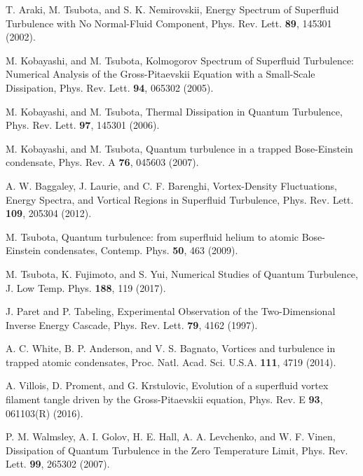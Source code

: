 \documentclass[aps,onecolumn,pra,longbibliography]{revtex4}
\begin{document}
\begin{thebibliography}{99}
		T. Araki, M. Tsubota, and S. K. Nemirovskii,
		Energy Spectrum of Superfluid Turbulence with No Normal-Fluid Component,
		Phys. Rev. Lett. \textbf{89}, 145301 (2002).

		M. Kobayashi, and M. Tsubota,
		Kolmogorov Spectrum of Superfluid Turbulence:
		Numerical Analysis of the Gross-Pitaevskii Equation
		with a Small-Scale Dissipation,
		Phys. Rev. Lett. \textbf{94}, 065302 (2005).

		M. Kobayashi, and M. Tsubota,
		Thermal Dissipation in Quantum Turbulence,
		Phys. Rev. Lett. \textbf{97}, 145301 (2006).

		M. Kobayashi, and M. Tsubota,
		Quantum turbulence in a trapped Bose-Einstein condensate,
		Phys. Rev. A \textbf{76}, 045603 (2007).

		A. W. Baggaley, J. Laurie, and C. F. Barenghi,
		Vortex-Density Fluctuations, Energy Spectra,
		and Vortical Regions in Superfluid Turbulence,
		Phys. Rev. Lett. \textbf{109}, 205304 (2012).

		M. Tsubota,
		Quantum turbulence: from superfluid helium to atomic Bose-Einstein condensates,
		Contemp. Phys. \textbf{50}, 463 (2009).

		M. Tsubota, K. Fujimoto, and S. Yui,
		Numerical Studies of Quantum Turbulence,
		J. Low Temp. Phys. \textbf{188}, 119 (2017).

		J. Paret and P. Tabeling,
		Experimental Observation of the Two-Dimensional Inverse Energy Cascade,
		Phys. Rev. Lett. \textbf{79}, 4162 (1997).

		A. C. White, B. P. Anderson, and V. S. Bagnato,
		Vortices and turbulence in trapped atomic condensates,
		Proc. Natl. Acad. Sci. U.S.A. \textbf{111}, 4719 (2014).

		A. Villois, D. Proment, and G. Krstulovic,
		Evolution of a superfluid vortex filament tangle driven
		by the Gross-Pitaevskii equation,
		Phys. Rev. E \textbf{93}, 061103(R) (2016).

		P. M. Walmsley, A. I. Golov, H. E. Hall, A. A. Levchenko, and W. F. Vinen,
		Dissipation of Quantum Turbulence in the Zero Temperature Limit,
		Phys. Rev. Lett. \textbf{99}, 265302 (2007).


\end{thebibliography}
\end{document}
